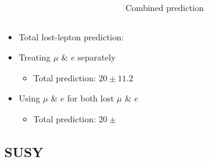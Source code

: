 \documentclass{beamer}
\begin{document}
\begin{frame}
\begin{columns}
\begin{column}{0.5\textwidth}
   \end{column}
   \begin{column}{0.5\textwidth}
    \begin{center}
    Combined prediction
    \end{center}
   \end{column}

  \end{columns}
\begin{itemize}
 \item Total lost-lepton prediction:
 \item Treating $\mu$ \& $e$ separately
 \begin{itemize}
  \item Total prediction: $20\pm11.2$
 \end{itemize}
 \item Using $\mu$ \& $e$ for both lost $\mu$ \& $e$
 \begin{itemize}
  \item Total prediction: $20\pm$
 \end{itemize}


\end{itemize}




\end{frame}






\subsection{SUSY}
\end{document}

